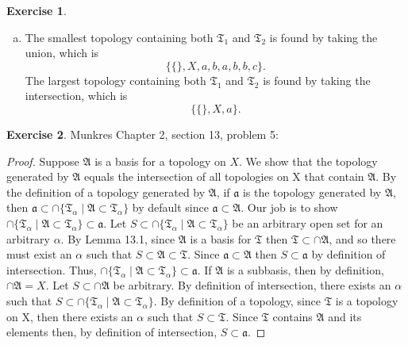 \documentclass[12pt]{article}
\theoremstyle{definition}
\newtheorem{exercise}{Exercise}
\begin{document}
\begin{exercise}
\begin{enumerate}[(a)]
	\item The smallest topology containing both $\mathfrak{T}_1$ and $\mathfrak{T}_2$ is
	    found by taking the union, which is \begin{equation}\{\{\},X,{a},{b},{a,b},{b,c}\}.\end{equation} \newline The largest topology containing both $\mathfrak{T}_1$ and $\mathfrak{T}_2$ is found by taking the intersection, which is \begin{equation}\{\{\},X,{a}\}.\end{equation}
\end{enumerate}
\end{exercise}

\begin{exercise} Munkres Chapter 2, section 13, problem 5:
\begin{proof}
	Suppose $\mathfrak{A}$ is a basis for a topology on $X$. We show that the topology generated by $\mathfrak{A}$ equals the intersection of all topologies on X that contain $\mathfrak{A}$. By the definition of a topology generated by $\mathfrak{A}$, if $\mathfrak{a}$ is the topology generated by $\mathfrak{A}$, then $\mathfrak{a}\subset \cap\{\mathfrak{T}_\alpha\mid\mathfrak{A}\subset \mathfrak{T}_\alpha\}$ by default since $\mathfrak{a}\subset \mathfrak{A}$. Our job is to show $\cap\{\mathfrak{T}_\alpha\mid\mathfrak{A}\subset \mathfrak{T}_\alpha\}\subset \mathfrak{a}$. Let $S\subset \cap\{\mathfrak{T}_\alpha\mid\mathfrak{A}\subset \mathfrak{T}_\alpha\}$ be an arbitrary open set for an arbitrary $\alpha$. By Lemma 13.1, since $\mathfrak{A}$ is a basis for $\mathfrak{T}$ then $\mathfrak{T}\subset \cap\mathfrak{A}$, and so there must exist an $\alpha$ such that $S\subset\mathfrak{A}\subset\mathfrak{T}$. Since $\mathfrak{a}\subset\mathfrak{A}$ then $S\subset\mathfrak{a}$ by definition of intersection. Thus, $\cap\{\mathfrak{T}_\alpha\mid\mathfrak{A}\subset \mathfrak{T}_\alpha\}\subset \mathfrak{a}$.
	If $\mathfrak{A}$ is a subbasis, then by definition, $\cap\mathfrak{A}=X$. Let $S\subset\cap\mathfrak{A}$ be arbitrary. By definition of intersection, there exists an $\alpha$ such that $S\subset\cap\{\mathfrak{T}_\alpha\mid\mathfrak{A}\subset \mathfrak{T}_\alpha\}$. By definition of a topology, since $\mathfrak{T}$ is a topology on X, then there exists an $\alpha$ such that $S\subset\mathfrak{T}$. Since $\mathfrak{T}$ contains $\mathfrak{A}$ and its elements then, by definition of intersection, $S\subset\mathfrak{a}$.
\end{proof}
\end{exercise}
\end{document}
